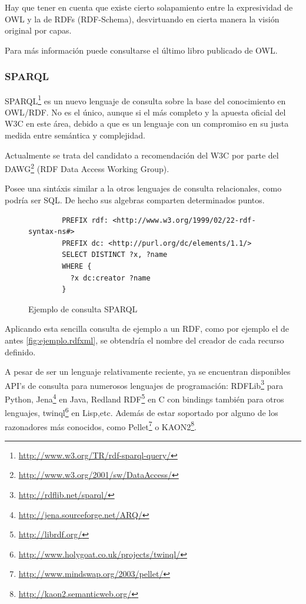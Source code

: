 Hay que tener en cuenta que existe cierto solapamiento entre la expresividad de
OWL y la de RDFs (RDF-Schema), desvirtuando en cierta manera la visión original
por capas.

Para más información puede consultarse el último libro publicado de 
OWL\cite{OWLBook}.

\subsubsection{SPARQL}

SPARQL\footnote{\url{http://www.w3.org/TR/rdf-sparql-query/}} es un nuevo lenguaje
de consulta sobre la base del conocimiento en OWL/RDF. No es el único\cite{ComparisonRDFQuery},
aunque si el más completo y la apuesta oficial del W3C en este área, debido a que es
un lenguaje con un compromiso en su justa medida entre semántica y 
complejidad\cite{SemanticsComplexitySPARQL}. 

Actualmente se trata del candidato a recomendación del W3C por parte del 
DAWG\footnote{\url{http://www.w3.org/2001/sw/DataAccess/}} (RDF Data Access Working 
Group).

Posee una sintáxis similar a la otros lenguajes de consulta relacionales, como
podría ser SQL. De hecho sus algebras comparten\cite{RelationalAlgebraSPARQL} 
determinados puntos. 

\begin{figure}[tp]
	\begin{verbatim}
		PREFIX rdf: <http://www.w3.org/1999/02/22-rdf-syntax-ns#>
		PREFIX dc: <http://purl.org/dc/elements/1.1/>
		SELECT DISTINCT ?x, ?name
		WHERE {
		  ?x dc:creator ?name
		}
	\end{verbatim}
	\centering
	\caption{Ejemplo de consulta SPARQL}
	\label{fig:ejemplo.sparql}
\end{figure}

Aplicando esta sencilla consulta de ejemplo a un RDF, como por ejemplo el de 
antes \ref{fig:ejemplo.rdfxml}, se obtendría el nombre del creador de cada recurso
definido.

A pesar de ser un lenguaje relativamente reciente, ya se encuentran disponibles
API's de consulta para numerosos lenguajes de programación: 
RDFLib\footnote{\url{http://rdflib.net/sparql/}} para Python, 
Jena\footnote{\url{http://jena.sourceforge.net/ARQ/}} en Java, 
Redland RDF\footnote{\url{http://librdf.org/}} en C con bindings también para 
otros lenguajes, twinql\footnote{\url{http://www.holygoat.co.uk/projects/twinql/}} 
en Lisp,etc. Además de estar soportado por alguno de los razonadores más conocidos, 
como Pellet\footnote{\url{http://www.mindswap.org/2003/pellet/}} o 
KAON2\footnote{\url{http://kaon2.semanticweb.org/}}.

